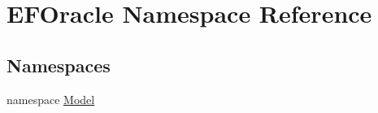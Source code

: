 \hypertarget{namespace_e_f_oracle}{}\section{E\+F\+Oracle Namespace Reference}
\label{namespace_e_f_oracle}
\subsection*{Namespaces}
\begin{DoxyCompactItemize}
\item 
namespace \hyperlink{namespace_e_f_oracle_1_1_model}{Model}
\end{DoxyCompactItemize}
